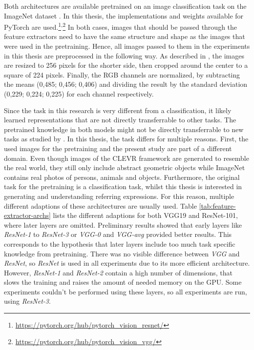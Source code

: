 Both architectures are available pretrained on an image classification task on the ImageNet dataset \citep{Deng2009}.
In this thesis, the implementations and weights available for PyTorch are used.\footnote{\href{https://pytorch.org/hub/pytorch\_vision\_resnet/}{https://pytorch.org/hub/pytorch\_vision\_resnet/}}\textsuperscript{,}\footnote{\href{https://pytorch.org/hub/pytorch\_vision\_vgg/}{https://pytorch.org/hub/pytorch\_vision\_vgg/}}
In both cases, images that should be passed through the feature extractors need to have the same structure and shape as the images that were used in the pretraining.
Hence, all images passed to them in the experiments in this thesis are preprocessed in the following way.
As described in \citep{He2016,Simonyan2015}, the images are resized to 256 pixels for the shorter side, then cropped around the center to a square of 224 pixels.
Finally, the RGB channels are normalized, by subtracting the means (0,485; 0,456; 0,406) and dividing the result by the standard deviation (0,229; 0,224; 0,225) for each channel respectively.

Since the task in this research is very different from a classification, it likely learned representations that are not directly transferrable to other tasks.
The pretrained knowledge in both models might not be directly transferrable to new tasks as studied by \citet{Yosinski2014}.
In this thesis, the task differs for multiple reasons.
First, the used images for the pretraining and the present study are part of a different domain.
Even though images of the CLEVR framework are generated to resemble the real world, they still only include abstract geometric objects while ImageNet contains real photos of persons, animals and objects.
Furthermore, the original task for the pretraining is a classification task, whilst this thesis is interested in generating and understanding referring expressions.
For this reason, multiple different adaptions of these architectures are usually used.
Table \ref{tab:feature-extractor-archs} lists the different adaptions for both VGG19 and ResNet-101, where later layers are omitted.
Preliminary results showed that early layers like \emph{ResNet-1} to \emph{ResNet-3} or \emph{VGG-0} and \emph{VGG-avg} provided better results.
This corresponds to the hypothesis that later layers include too much task specific knowledge from pretraining.
There was no visible difference between \emph{VGG} and \emph{ResNet}, so \emph{ResNet} is used in all experiments due to its more efficient architecture.
However, \emph{ResNet-1} and \emph{ResNet-2} contain a high number of dimensions, that slows the training and raises the amount of needed memory on the GPU.
Some experiments couldn't be performed using these layers, so all experiments are run, using \emph{ResNet-3}.

